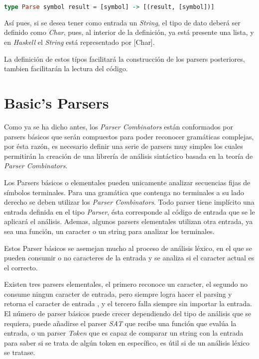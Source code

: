 \begin{lstlisting}[language=Haskell]
type Parse symbol result = [symbol] -> [(result, [symbol])]
\end{lstlisting}

Así pues, si se desea tener como entrada un \emph{String}, el tipo de dato deberá ser definido como \emph{Char}, pues, al interior de la definición, ya está presente una lista, y en \emph{Haskell} el \emph{String} está representado por [Char].

La definición de estos típos facilitará la construcción de los parsers posteriores, tambien facilitarán la lectura del código.


\section{Basic's Parsers}

Como ya se ha dicho antes, los \emph{Parser Combinators} están conformados por parsers básicos que serán compuestos para poder reconocer gramáticas complejas, por ésta razón, es necesario definir una serie de parsers muy simples los cuales permitirán la creación de una librería de análisis sintáctico basada en la teoría de \emph{Parser Combinators}. \cite{Jeuring2010,Hutton2007}

Los Parsers básicos o elementales pueden unicamente analizar secuencias fijas de símbolos terminales. Para una gramática que contenga no terminales a su lado derecho se deben utilizar los \emph{Parser Combinators}. \cite{Jeuring2010} Todo parser tiene implícito una entrada definida en el tipo \emph{Parser}, ésta corresponde al código de entrada que se le aplicará el análisis. Ademas, 
algunos parsers elementales utilizan otra entrada, ya sea una función, un caracter o un string para analizar los terminales.

Estos Parser básicos se asemejan mucho al proceso de análisis léxico, en el que se pueden consumir o no caracteres de la entrada y se analiza si el caracter actual es el correcto.

Existen tres parsers elementales, el primero reconoce un caracter, el segundo no consume ningun caracter de entrada, pero siempre logra hacer el parsing y retorna el caracter de entrada , y el tercero falla siempre sin importar la entrada. El número de parser básicos puede crecer dependiendo del tipo de análisis que se requiera, puede añadirse el parser \emph{SAT} que recibe una función que evalúa la entrada, o un parser \emph{Token} que es capaz de comparar un string con la entrada para saber si se trata de algún token en específico, es útil si de un análisis léxico se tratase.
 
